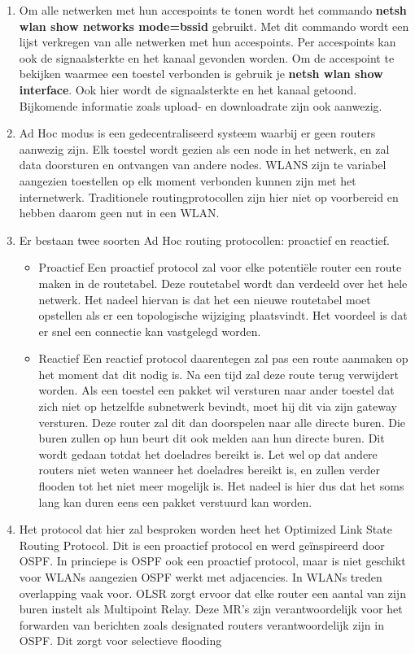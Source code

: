 \documentclass{report}
\begin{document}
\begin{enumerate}
	\item Om alle netwerken met hun accespoints te tonen wordt het commando \textbf{netsh wlan show networks mode=bssid} gebruikt. Met dit commando wordt een lijst verkregen van alle netwerken met hun accespoints. Per accespoints kan ook de signaalsterkte en het kanaal gevonden worden. Om de accespoint te bekijken waarmee een toestel verbonden is gebruik je \textbf{netsh wlan show interface}. Ook hier wordt de signaalsterkte en het kanaal getoond. Bijkomende informatie zoals upload- en downloadrate zijn ook aanwezig.
	\item Ad Hoc modus is een gedecentraliseerd systeem waarbij er geen routers aanwezig zijn. Elk toestel wordt gezien als een node in het netwerk, en zal data doorsturen en ontvangen van andere nodes. WLANS zijn te variabel aangezien toestellen op elk moment verbonden kunnen zijn met het internetwerk. Traditionele routingprotocollen zijn hier niet op voorbereid en hebben daarom geen nut in een WLAN.
	\item Er bestaan twee soorten Ad Hoc routing protocollen: proactief en reactief.
	\begin{itemize}
		\item Proactief
		\newline
		Een proactief protocol zal voor elke potentiële router een route maken in de routetabel. Deze routetabel wordt dan verdeeld over het hele netwerk. Het nadeel hiervan is dat het een nieuwe routetabel moet opstellen als er een topologische wijziging plaatsvindt. Het voordeel is dat er snel een connectie kan vastgelegd worden.
		\item Reactief
		\newline
		Een reactief protocol daarentegen zal pas een route aanmaken op het moment dat dit nodig is. Na een tijd zal deze route terug verwijdert worden. Als een toestel een pakket wil versturen naar ander toestel dat zich niet op hetzelfde subnetwerk bevindt, moet hij dit via zijn gateway versturen. Deze router zal dit dan doorspelen naar alle directe buren. Die buren zullen op hun beurt dit ook melden aan hun directe buren. Dit wordt gedaan totdat het doeladres bereikt is. Let wel op dat andere routers niet weten wanneer het doeladres bereikt is, en zullen verder flooden tot het niet meer mogelijk is. Het nadeel is hier dus dat het soms lang kan duren eens een pakket verstuurd kan worden. 
	\end{itemize} 
	\item Het protocol dat hier zal besproken worden heet het Optimized Link State Routing Protocol. Dit is een proactief protocol en werd geïnspireerd door OSPF. In princiepe is OSPF ook een proactief protocol, maar is niet geschikt voor WLANs aangezien OSPF werkt met adjacencies. In WLANs treden overlapping vaak voor. OLSR zorgt ervoor dat elke router een aantal van zijn buren instelt als Multipoint Relay. Deze MR's zijn verantwoordelijk voor het forwarden van berichten zoals designated routers verantwoordelijk zijn in OSPF. Dit zorgt voor selectieve flooding

\end{enumerate}
\end{document}
